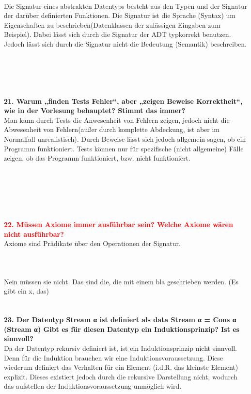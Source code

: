 \documentclass{article}
\begin{document}
\\
Die Signatur eines abstrakten Datentyps besteht aus den Typen und der Signatur der darüber definierten Funktionen. Die Signatur ist die Sprache (Syntax) um Eigenschaften zu beschrieben(Datenklassen der zul\"assigen Eingaben zum Beispiel). Dabei lässt sich durch die Signatur der ADT typkorrekt benutzen. Jedoch lässt sich durch die Signatur nicht die Bedeutung (Semantik) beschreiben.\\
\\
\\
\\
\\
\\
\textbf{21. Warum „finden Tests Fehler“, aber „zeigen Beweise Korrektheit“, wie in der Vorlesung behauptet? Stimmt das immer?}
\\
Man kann durch Tests die Anwesenheit von Fehlern zeigen, jedoch nicht die Abwesenheit von Fehlern(au\ss er durch komplette Abdeckung, ist aber im Normalfall unrealistisch). Durch Beweise lässt sich jedoch allgemein sagen, ob ein Programm funktioniert. Tests können nur für spezifische (nicht allgemeine) Fälle zeigen, ob das Programm funktioniert, bzw. nicht funktioniert. \\
\\
\\
\\
\\
\\
\\
\textcolor{red}{\textbf{22. Müssen Axiome immer ausführbar sein? Welche Axiome wären nicht ausführbar?}}
\\
Axiome sind Prädikate über den Operationen der Signatur.\\
\\
\\
\\
Nein müssen sie nicht. Das sind die, die mit einem bla geschrieben werden. (Es gibt ein x, das)
\\
\\
\\
\textbf{23. Der Datentyp Stream α ist definiert als data Stream α = Cons α (Stream α)
Gibt es für diesen Datentyp ein Induktionsprinzip? Ist es sinnvoll?}
\\
Da der Datentyp rekursiv definiert ist, ist ein Induktionsprinzip nicht sinnvoll. Denn für die Induktion brauchen wir eine Induktionsvoraussetzung. Diese wiederum definiert das Verhalten für ein Element (i.d.R. das kleinste Element) explizit. Dieses existiert jedoch durch die rekursive Darstellung nicht, wodurch das aufstellen der Induktionsvoraussetzung unmöglich wird. \\
\end{document}
